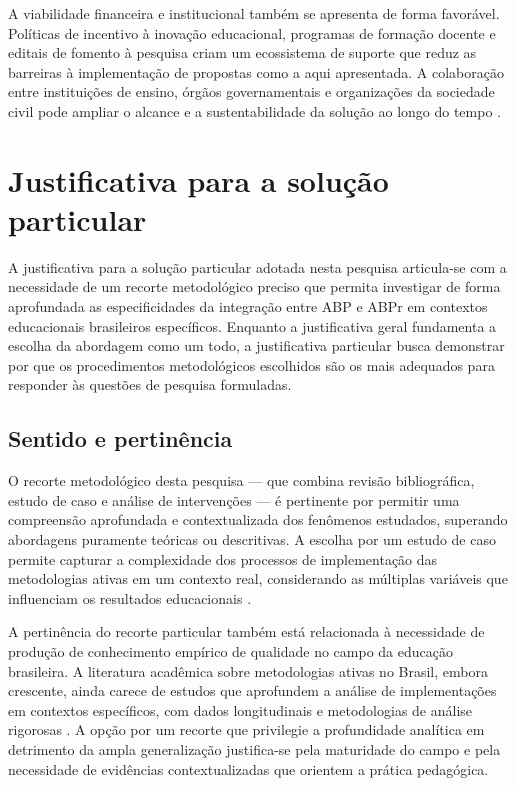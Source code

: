 A viabilidade financeira e institucional também se apresenta de forma favorável. Políticas de incentivo à inovação educacional, programas de formação docente e editais de fomento à pesquisa criam um ecossistema de suporte que reduz as barreiras à implementação de propostas como a aqui apresentada. A colaboração entre instituições de ensino, órgãos governamentais e organizações da sociedade civil pode ampliar o alcance e a sustentabilidade da solução ao longo do tempo \cite{FREITAS2024}.

\section{Justificativa para a solução particular}
\label{sec:justificativa_particular}

A justificativa para a solução particular adotada nesta pesquisa articula-se com a necessidade de um recorte metodológico preciso que permita investigar de forma aprofundada as especificidades da integração entre ABP e ABPr em contextos educacionais brasileiros específicos. Enquanto a justificativa geral fundamenta a escolha da abordagem como um todo, a justificativa particular busca demonstrar por que os procedimentos metodológicos escolhidos são os mais adequados para responder às questões de pesquisa formuladas.

\subsection{Sentido e pertinência}
\label{subsec:jp_sentido}

O recorte metodológico desta pesquisa — que combina revisão bibliográfica, estudo de caso e análise de intervenções — é pertinente por permitir uma compreensão aprofundada e contextualizada dos fenômenos estudados, superando abordagens puramente teóricas ou descritivas. A escolha por um estudo de caso permite capturar a complexidade dos processos de implementação das metodologias ativas em um contexto real, considerando as múltiplas variáveis que influenciam os resultados educacionais \cite{CRESWELL2018}.

A pertinência do recorte particular também está relacionada à necessidade de produção de conhecimento empírico de qualidade no campo da educação brasileira. A literatura acadêmica sobre metodologias ativas no Brasil, embora crescente, ainda carece de estudos que aprofundem a análise de implementações em contextos específicos, com dados longitudinais e metodologias de análise rigorosas \cite{PAIVA2016}. A opção por um recorte que privilegie a profundidade analítica em detrimento da ampla generalização justifica-se pela maturidade do campo e pela necessidade de evidências contextualizadas que orientem a prática pedagógica.

